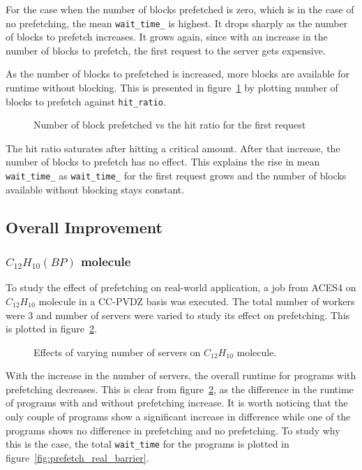 For the case when the number of blocks prefetched is zero, which is in the case of no
prefetching, the mean \texttt{wait\_time\_} is highest. It drops sharply as the
number of blocks to prefetch increases. It grows again, since with an increase
in the number of blocks to prefetch, the first request to the server gets expensive.

As the number of blocks to prefetched is increased, more blocks are available for
runtime without blocking. This is presented in figure~\ref{fig:look_ahead_hit_ratio}
by plotting number of blocks to prefetch against \texttt{hit\_ratio}.

\begin{figure}[h]
  
  \caption{Number of block prefetched vs the hit ratio for the first request}
  \label{fig:look_ahead_hit_ratio}
\end{figure}

The hit ratio saturates after hitting a critical amount. After that increase, the number
of blocks to prefetch has no effect. This explains the rise in mean
\texttt{wait\_time\_} as \texttt{wait\_time\_} for the first request grows and the
number of blocks available without blocking stays constant.

\subsection{Overall Improvement}
\subsubsection{$C_{12}H_{10}(BP)$ molecule}\label{sec:bp_molecule}
To study the effect of prefetching on real-world application, a job from ACES4 on
$C_{12}H_{10}$ molecule in a CC-PVDZ basis was executed. The total number of workers were 3 and number
of servers were varied to study its effect on prefetching. This is plotted in
figure~\ref{fig:prefetch_real}.

\begin{figure}[h]
  
  \caption{Effects of varying number of servers on $C_{12}H_{10}$ molecule.}
  \label{fig:prefetch_real}
\end{figure}

With the increase in the number of servers, the overall runtime for programs with
prefetching decreases. This is clear from figure~\ref{fig:prefetch_real}, as the difference
in the runtime of programs with and without prefetching increase. It is worth noticing
that the only couple of programs show a significant increase in difference while one
of the programs shows no difference in prefetching and no prefetching. To study
why this is the case, the total \texttt{wait\_time} for the programs is plotted in
figure~\ref{fig:prefetch_real_barrier}.

